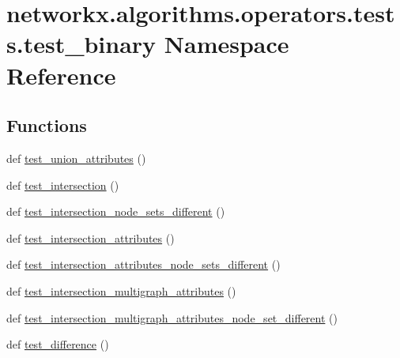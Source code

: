 \hypertarget{namespacenetworkx_1_1algorithms_1_1operators_1_1tests_1_1test__binary}{}\section{networkx.\+algorithms.\+operators.\+tests.\+test\+\_\+binary Namespace Reference}
\label{namespacenetworkx_1_1algorithms_1_1operators_1_1tests_1_1test__binary}
\subsection*{Functions}
\begin{DoxyCompactItemize}
\item 
def \hyperlink{namespacenetworkx_1_1algorithms_1_1operators_1_1tests_1_1test__binary_a00b6a469dd224d8a53ee571bee5c501b}{test\+\_\+union\+\_\+attributes} ()
\item 
def \hyperlink{namespacenetworkx_1_1algorithms_1_1operators_1_1tests_1_1test__binary_a54ade4e6255ddd869a02a3f24772824d}{test\+\_\+intersection} ()
\item 
def \hyperlink{namespacenetworkx_1_1algorithms_1_1operators_1_1tests_1_1test__binary_adcb11d117266b3dd49588bdea1ae26e3}{test\+\_\+intersection\+\_\+node\+\_\+sets\+\_\+different} ()
\item 
def \hyperlink{namespacenetworkx_1_1algorithms_1_1operators_1_1tests_1_1test__binary_a35d36aac9a3f592baa3201d01646110d}{test\+\_\+intersection\+\_\+attributes} ()
\item 
def \hyperlink{namespacenetworkx_1_1algorithms_1_1operators_1_1tests_1_1test__binary_a1887a97a61324beb6df064172307d5b1}{test\+\_\+intersection\+\_\+attributes\+\_\+node\+\_\+sets\+\_\+different} ()
\item 
def \hyperlink{namespacenetworkx_1_1algorithms_1_1operators_1_1tests_1_1test__binary_aa0d05dc58b1ea7fcb1d0b53d51af3e5d}{test\+\_\+intersection\+\_\+multigraph\+\_\+attributes} ()
\item 
def \hyperlink{namespacenetworkx_1_1algorithms_1_1operators_1_1tests_1_1test__binary_a72a88b1250c16c1e34dcb6ea4f6b3ba6}{test\+\_\+intersection\+\_\+multigraph\+\_\+attributes\+\_\+node\+\_\+set\+\_\+different} ()
\item 
def \hyperlink{namespacenetworkx_1_1algorithms_1_1operators_1_1tests_1_1test__binary_a66d1485986d3265c2cb4e7df3b9766fd}{test\+\_\+difference} ()
\item 

\end{DoxyCompactItemize}
